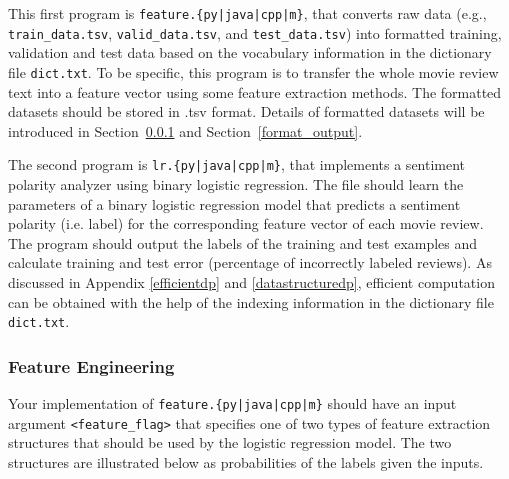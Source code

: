 \documentclass[11pt]{article}
\numberwithin{equation}{section} %
\numberwithin{figure}{section} %
\numberwithin{table}{section} %
\begin{document}
This first program is \texttt{feature.\{py|java|cpp|m\}}, that converts raw data (e.g., \lstinline{train_data.tsv}, \lstinline{valid_data.tsv}, and \lstinline{test_data.tsv}) into formatted training, validation and test data based on the vocabulary information in the dictionary file \lstinline{dict.txt}. To be specific, this program is to transfer the whole movie review text into a feature vector using some feature extraction methods. The formatted datasets should be stored in .tsv format. Details of formatted datasets will be introduced in Section~\ref{feature} and Section~\ref{format_output}.

The second program is \texttt{lr.\{py|java|cpp|m\}}, that implements a sentiment polarity analyzer using binary logistic regression. The file should learn the parameters of a binary logistic regression model that predicts a sentiment polarity (i.e. label) for the corresponding feature vector of each movie review. The program should output the labels of the training and test examples and calculate training and test error (percentage of incorrectly labeled reviews). As discussed in Appendix \ref{efficientdp} and \ref{datastructuredp}, efficient computation can be obtained with the help of the indexing information in the dictionary file \lstinline{dict.txt}.

\subsubsection{Feature Engineering} \label{feature}

Your implementation of \texttt{feature.\{py|java|cpp|m\}} should have an input argument \texttt{<feature\_flag>} that specifies one of two types of feature extraction structures that should be used by the logistic regression model. The two structures are illustrated below as probabilities of the labels given the inputs.
\end{document}
